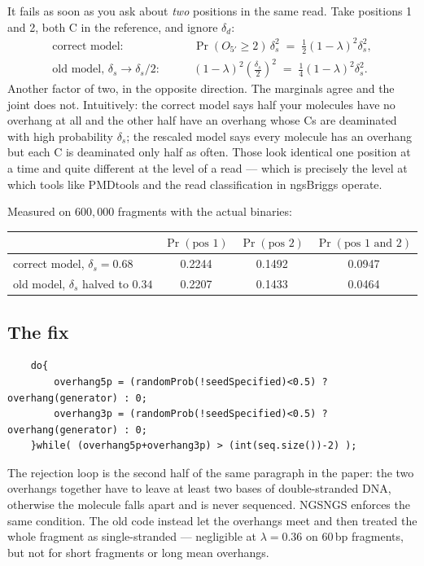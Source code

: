 \documentclass[11pt,a4paper]{article}
\newcommand{\Ol}{O_{5'}}
\begin{document}
It fails as soon as you ask about \emph{two} positions in the same read. Take
positions 1 and 2, both C in the reference, and ignore $\delta_d$:
\begin{align}
\text{correct model:} \qquad
  & \Pr(\Ol \geq 2)\, \delta_s^2 \;=\; \tfrac12 (1-\lambda)^2 \delta_s^2 , \\
\text{old model, } \delta_s \to \delta_s/2: \qquad
  & (1-\lambda)^2 \left(\tfrac{\delta_s}{2}\right)^{\!2}
    \;=\; \tfrac14 (1-\lambda)^2 \delta_s^2 .
\end{align}
Another factor of two, in the opposite direction. The marginals agree and the joint
does not. Intuitively: the correct model says half your molecules have no overhang at
all and the other half have an overhang whose Cs are deaminated with high probability
$\delta_s$; the rescaled model says every molecule has an overhang but each C is
deaminated only half as often. Those look identical one position at a time and quite
different at the level of a read --- which is precisely the level at which tools like
PMDtools and the read classification in ngsBriggs operate.

Measured on $600{,}000$ fragments with the actual binaries:
\begin{center}
\begin{tabular}{lccc}
\toprule
 & $\Pr(\text{pos } 1)$ & $\Pr(\text{pos } 2)$ & $\Pr(\text{pos }1 \text{ and } 2)$ \\
\midrule
correct model, $\delta_s = 0.68$            & 0.2244 & 0.1492 & 0.0947 \\
old model, $\delta_s$ halved to $0.34$      & 0.2207 & 0.1433 & 0.0464 \\
\bottomrule
\end{tabular}
\end{center}

\subsection{The fix}

\begin{verbatim}
    do{
        overhang5p = (randomProb(!seedSpecified)<0.5) ? overhang(generator) : 0;
        overhang3p = (randomProb(!seedSpecified)<0.5) ? overhang(generator) : 0;
    }while( (overhang5p+overhang3p) > (int(seq.size())-2) );
\end{verbatim}

\noindent
The rejection loop is the second half of the same paragraph in the paper: the two
overhangs together have to leave at least two bases of double-stranded DNA, otherwise
the molecule falls apart and is never sequenced. NGSNGS enforces the same condition.
The old code instead let the overhangs meet and then treated the whole fragment as
single-stranded --- negligible at $\lambda = 0.36$ on $60$\,bp fragments, but not for
short fragments or long mean overhangs.
\end{document}
